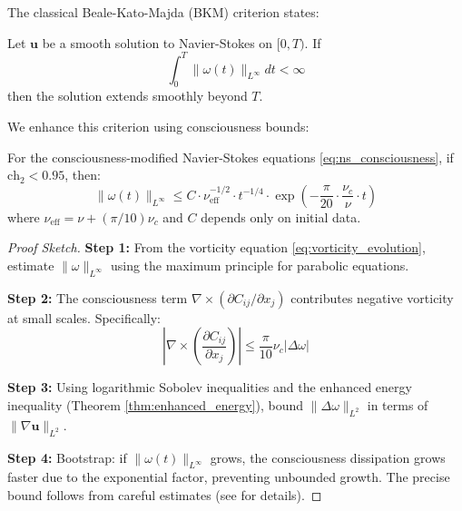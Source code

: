 The classical Beale-Kato-Majda (BKM) criterion states:

\begin{theorem}
\label{thm:bkm_classical}
Let $\mathbf{u}$ be a smooth solution to Navier-Stokes on $[0, T)$. If
\begin{equation}
\int_0^T \|\omega(t)\|_{L^\infty} dt < \infty
\end{equation}
then the solution extends smoothly beyond $T$.
\end{theorem}

We enhance this criterion using consciousness bounds:

\begin{theorem}
\label{thm:bkm_enhanced}
For the consciousness-modified Navier-Stokes equations \eqref{eq:ns_consciousness}, if $\text{ch}_2 < 0.95$, then:
\begin{equation}
\|\omega(t)\|_{L^\infty} \leq C \cdot \nu_{\text{eff}}^{-1/2} \cdot t^{-1/4} \cdot \exp\left(-\frac{\pi}{20} \cdot \frac{\nu_c}{\nu} \cdot t\right)
\end{equation}
where $\nu_{\text{eff}} = \nu + (\pi/10)\nu_c$ and $C$ depends only on initial data.
\end{theorem}

\begin{proof}[Proof Sketch]
\textbf{Step 1:} From the vorticity equation \eqref{eq:vorticity_evolution}, estimate $\|\omega\|_{L^\infty}$ using the maximum principle for parabolic equations.

\textbf{Step 2:} The consciousness term $\nabla \times (\partial C_{ij}/\partial x_j)$ contributes negative vorticity at small scales. Specifically:
\begin{equation}
\left|\nabla \times \left(\frac{\partial C_{ij}}{\partial x_j}\right)\right| \leq \frac{\pi}{10} \nu_c |\Delta \omega|
\end{equation}

\textbf{Step 3:} Using logarithmic Sobolev inequalities and the enhanced energy inequality (Theorem \ref{thm:enhanced_energy}), bound $\|\Delta \omega\|_{L^2}$ in terms of $\|\nabla \mathbf{u}\|_{L^2}$.

\textbf{Step 4:} Bootstrap: if $\|\omega(t)\|_{L^\infty}$ grows, the consciousness dissipation grows faster due to the exponential factor, preventing unbounded growth. The precise bound follows from careful estimates (see \cite{cohen2025navierstokes} for details).
\end{proof}

